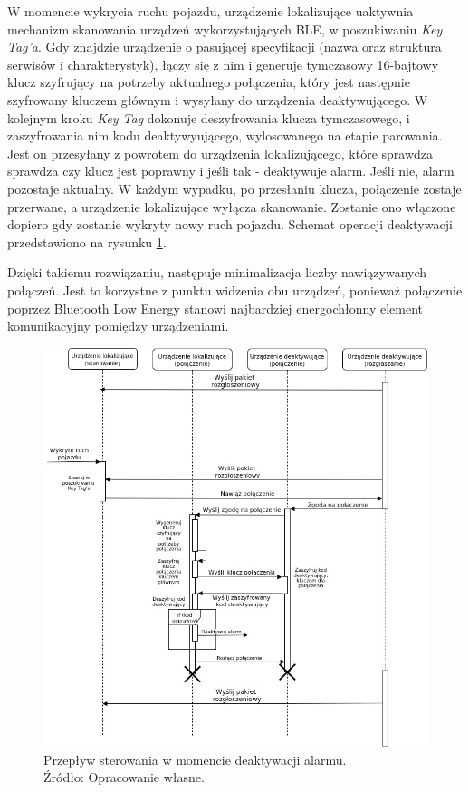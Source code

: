 \pagebreak
W momencie wykrycia ruchu pojazdu, urządzenie lokalizujące uaktywnia mechanizm skanowania urządzeń wykorzystujących BLE, w poszukiwaniu \textit{Key Tag'a}. Gdy znajdzie urządzenie o pasującej specyfikacji (nazwa oraz struktura serwisów i charakterystyk), łączy się z nim i generuje tymczasowy 16-bajtowy klucz szyfrujący na potrzeby aktualnego połączenia, który jest następnie szyfrowany kluczem głównym i wysyłany do urządzenia deaktywującego. W kolejnym kroku \textit{Key Tag} dokonuje deszyfrowania klucza tymczasowego, i zaszyfrowania nim kodu deaktywyującego, wylosowanego na etapie parowania. Jest on przesyłany z powrotem do urządzenia lokalizującego, które sprawdza sprawdza czy klucz jest poprawny i jeśli tak - deaktywuje alarm. Jeśli nie, alarm pozostaje aktualny. W każdym wypadku, po przesłaniu klucza, połączenie zostaje przerwane, a urządzenie lokalizujące wyłącza skanowanie. Zostanie ono włączone dopiero gdy zostanie wykryty nowy ruch pojazdu. Schemat operacji deaktywacji przedstawiono na rysunku \ref{fig:image_soft_keytag_alarm_deactivation}.

Dzięki takiemu rozwiązaniu, następuje minimalizacja liczby nawiązywanych połączeń. Jest to korzystne z punktu widzenia obu urządzeń, ponieważ połączenie poprzez Bluetooth Low Energy stanowi najbardziej energochłonny element komunikacyjny pomiędzy urządzeniami.  

\begin{figure}[H]
	\centering
	\includegraphics[width=17cm]{img/software/keytag/alarm_deactivation.jpg}
	\caption{Przepływ sterowania w momencie deaktywacji alarmu. 
	\\Źródło: Opracowanie własne.}
	\label{fig:image_soft_keytag_alarm_deactivation}
\end{figure}